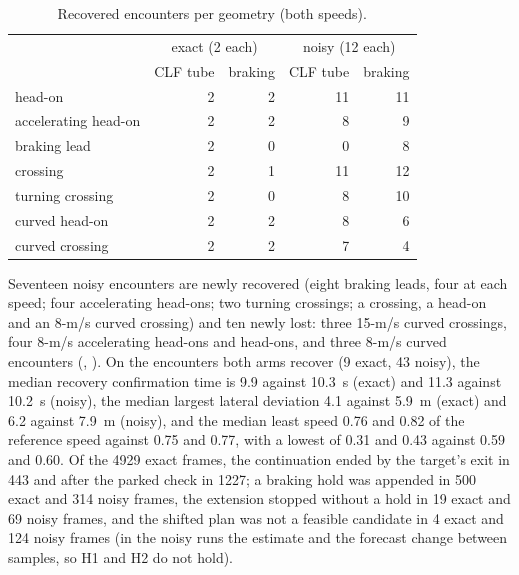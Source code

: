 \documentclass[11pt]{article}
\begin{document}
\begin{table}[h]
\centering\small
\caption{Recovered encounters per geometry (both speeds).}
\label{tab:geometry}
\begin{tabular}{lrrrr}
\toprule
 & \multicolumn{2}{c}{exact (2 each)} & \multicolumn{2}{c}{noisy (12 each)}\\
 & CLF tube & braking & CLF tube & braking\\
\midrule
head-on & 2 & 2 & 11 & 11\\
accelerating head-on & 2 & 2 & 8 & 9\\
braking lead & 2 & 0 & 0 & 8\\
crossing & 2 & 1 & 11 & 12\\
turning crossing & 2 & 0 & 8 & 10\\
curved head-on & 2 & 2 & 8 & 6\\
curved crossing & 2 & 2 & 7 & 4\\
\bottomrule
\end{tabular}
\end{table}

Seventeen noisy encounters are newly recovered (eight braking leads, four at
each speed; four accelerating head-ons; two turning crossings; a crossing, a
head-on and an 8-m/s curved crossing) and ten newly lost: three 15-m/s curved
crossings, four 8-m/s accelerating head-ons and head-ons, and three 8-m/s
curved encounters (, ). On the
encounters both arms recover (9 exact, 43 noisy), the median recovery
confirmation time is 9.9 against 10.3~s (exact) and 11.3 against 10.2~s
(noisy), the median largest lateral deviation 4.1 against 5.9~m (exact) and
6.2 against 7.9~m (noisy), and the median least speed 0.76 and 0.82 of the
reference speed against 0.75 and 0.77, with a lowest of 0.31 and 0.43
against 0.59 and 0.60. Of the 4929 exact frames, the continuation ended by
the target's exit in 443 and after the parked check in 1227; a braking hold
was appended in 500 exact and 314 noisy frames, the extension stopped without
a hold in 19 exact and 69 noisy frames, and the shifted plan was not a
feasible candidate in 4 exact and 124 noisy frames (in the noisy runs the
estimate and the forecast change between samples, so H1 and H2 do not
hold).
\end{document}
